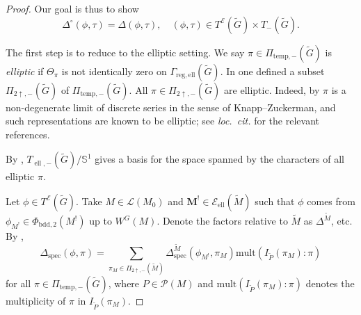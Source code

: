 \documentclass[11pt, a4paper, openany]{book}
\newenvironment{Proof of claim}
  {\renewcommand\qedsymbol{$\blacksquare$}\begin{proof}[Proof of claim]}
  {\end{proof}}
\newcommand{\Endo}{\ensuremath{\mathcal{E}}}
\newcommand{\elli}{\operatorname{ell}}
\theoremstyle{remark}
\theoremstyle{remark}
\theoremstyle{remark}
\theoremstyle{remark}
\begin{document}
\begin{proof}
	Our goal is thus to show
	\begin{equation}\label{eqn:local-character-relation-aux-1}
		\Delta^\circ(\phi, \tau) = \Delta(\phi, \tau), \quad (\phi, \tau) \in T^{\Endo}(\tilde{G}) \times T_-(\tilde{G}).
	\end{equation}

	The first step is to reduce to the elliptic setting. We say $\pi \in \Pi_{\mathrm{temp}, -}(\tilde{G})$ is \emph{elliptic} if $\Theta_\pi$ is not identically zero on $\Gamma_{\mathrm{reg, ell}}(\tilde{G})$. In \cite[Definition 7.4.1]{Li19} one defined a subset $\Pi_{2\uparrow, -}(\tilde{G})$ of $\Pi_{\mathrm{temp}, -}(\tilde{G})$. All $\pi \in \Pi_{2\uparrow, -}(\tilde{G})$ are elliptic. Indeed, by \cite[Remark 7.5.1]{Li19} $\pi$ is a non-degenerate limit of discrete series in the sense of Knapp--Zuckerman, and such representations are known to be elliptic; see \textit{loc.\ cit.} for the relevant references.
	
	By \cite[Proposition 5.4.4]{Li12b}, $T_{\elli, -}(\tilde{G})/\mathbb{S}^1$ gives a basis for the space spanned by the characters of all elliptic $\pi$.
	
	Let $\phi \in T^{\Endo}(\tilde{G})$. Take $M \in \mathcal{L}(M_0)$ and $\mathbf{M}^! \in \Endo_{\elli}(\tilde{M})$ such that $\phi$ comes from $\phi_{M^!} \in \Phi_{\mathrm{bdd}, 2}(M^!)$ up to $W^G(M)$. Denote the factors relative to $\tilde{M}$ as $\Delta^{\tilde{M}}$, etc. By \cite[Theorem 7.4.3]{Li19},
	\[ \Delta_{\mathrm{spec}}(\phi, \pi) = \sum_{\pi_M \in \Pi_{2\uparrow, -}(\tilde{M})} \Delta^{\tilde{M}}_{\mathrm{spec}}(\phi_{M^!}, \pi_M) \mathrm{mult}(I_{\tilde{P}}(\pi_M) : \pi) \]
	for all $\pi \in \Pi_{\mathrm{temp}, -}(\tilde{G})$, where $P \in \mathcal{P}(M)$ and $\mathrm{mult}(I_{\tilde{P}}(\pi_M) : \pi)$ denotes the multiplicity of $\pi$ in $I_{\tilde{P}}(\pi_M)$.


\end{proof}
\end{document}
